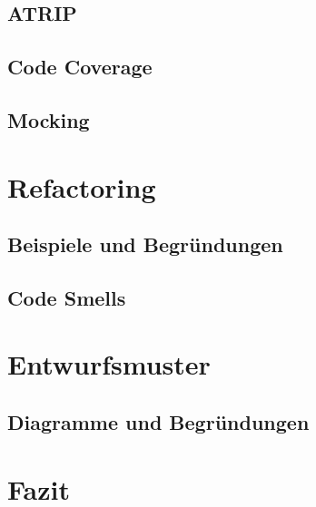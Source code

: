 \documentclass{article}
\begin{document}
\subsection{ATRIP}
\subsection{Code Coverage}
\subsection{Mocking}

\section{Refactoring}
\subsection{Beispiele und Begründungen}
\subsection{Code Smells}

\section{Entwurfsmuster}
\subsection{Diagramme und Begründungen}

\section{Fazit}\label{sec:end}
\end{document}
